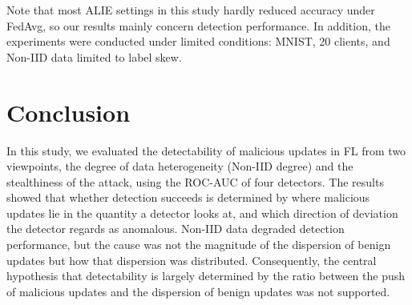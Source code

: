 \documentclass[a4paper,10pt]{article}
\begin{document}
Note that most ALIE settings in this study hardly reduced accuracy under FedAvg, so our results mainly concern detection performance. In addition, the experiments were conducted under limited conditions: MNIST, 20 clients, and Non-IID data limited to label skew.

\section{Conclusion}
\label{sec:conclusion}

In this study, we evaluated the detectability of malicious updates in FL from two viewpoints, the degree of data heterogeneity (Non-IID degree) and the stealthiness of the attack, using the ROC-AUC of four detectors. The results showed that whether detection succeeds is determined by where malicious updates lie in the quantity a detector looks at, and which direction of deviation the detector regards as anomalous. Non-IID data degraded detection performance, but the cause was not the magnitude of the dispersion of benign updates but how that dispersion was distributed. Consequently, the central hypothesis that detectability is largely determined by the ratio between the push of malicious updates and the dispersion of benign updates was not supported.
\end{document}
